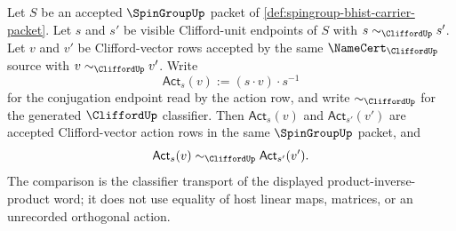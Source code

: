 \begin{theorem}
\label{thm:spingroup-conjugation-action-classifier-congruence}
Let $S$ be an accepted $\SpinGroupUp$ packet of
\autoref{def:spingroup-bhist-carrier-packet}. Let $s$ and $s'$ be visible
Clifford-unit endpoints of $S$ with
$s\sim_{\CliffordUp}s'$. Let $v$ and $v'$ be Clifford-vector rows accepted by
the same $\NameCert_{\CliffordUp}$ source with
$v\sim_{\CliffordUp}v'$. Write
$$
\mathsf{Act}_{s}(v):=(s\cdot v)\cdot s^{-1}
$$
for the conjugation endpoint read by the action row, and write
$\sim_{\CliffordUp}$ for the generated $\CliffordUp$ classifier. Then
$\mathsf{Act}_{s}(v)$ and $\mathsf{Act}_{s'}(v')$ are accepted
Clifford-vector action rows in the same $\SpinGroupUp$ packet, and
$$
\mathsf{Act}_{s}(v)\sim_{\CliffordUp}\mathsf{Act}_{s'}(v').
$$
The comparison is the classifier transport of the displayed
product-inverse-product word; it does not use equality of host linear maps,
matrices, or an unrecorded orthogonal action.
\end{theorem}

